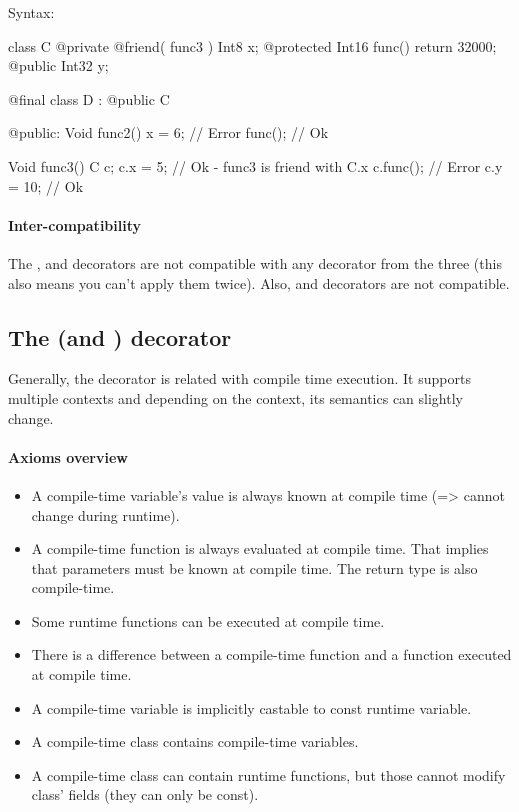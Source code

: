 Syntax: 

\begin{code}
class C {
	@private @friend( func3 ) Int8 x;
	@protected Int16 func() {
		return 32000;
	}	
	@public Int32 y;
}

@final class D : @public C {
	
@public:
	Void func2() {
		x = 6; // Error
		func(); // Ok
	}
	
}

Void func3() {
	C c;
	c.x = 5; // Ok - func3 is friend with C.x
	c.func(); // Error
	c.y = 10; // Ok
}
\end{code}

\paragraph{Inter-compatibility}
The ,  and  decorators are not compatible with any decorator from the three (this also means you can't apply them twice). Also,  and  decorators are not compatible.

\subsection{The  (and ) decorator} \label{decorator:ctime} \label{decorator:autoCtime}
Generally, the  decorator is related with compile time execution. It supports multiple contexts and depending on the context, its semantics can slightly change.

\paragraph{Axioms overview}
\begin{itemize}
	\item A compile-time variable's value is always known at compile time (=> cannot change during runtime).
	\item A compile-time function is always evaluated at compile time. That implies that parameters must be known at compile time. The return type is also compile-time.
	\item Some runtime functions can be executed at compile time.
	\item There is a difference between a compile-time function and a function executed at compile time.
	\item A compile-time variable is implicitly castable to const runtime variable.
	\item A compile-time class contains compile-time variables.
	\item A compile-time class can contain runtime functions, but those cannot modify class' fields (they can only be const).
\end{itemize}

